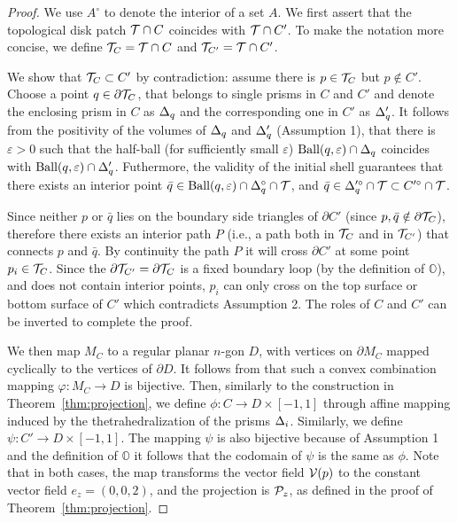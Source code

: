 \begin{proof}

    We use $A^\circ$ to denote the interior of a set $A$. 
    We first assert that the topological disk patch $\T \cap C$ coincides with $\T \cap C'$.
    To make the notation more concise, we define $\T_C = \T \cap C$ and $\T_{C'} = \T \cap C'$.
    
    We show that $\T_C \subset C'$ by contradiction: assume there is $p\in \T_C$ but $p \not\in C'$.
    Choose a point $q \in \partial \T_C$,  that belongs to single prisms in $C$ and $C'$ and denote the enclosing prism in $C$ as $\Prism_q$ and the corresponding one in $C'$ as $\Prism_{q}'$.
    It follows from the positivity of the volumes of $\Prism_q$ and $\Prism_q'$ (Assumption 1), that there is  $\varepsilon>0$ such that the half-ball (for sufficiently small $\varepsilon$)  $\text{Ball}(q, \varepsilon) \cap \Prism_q$  coincides with $ \text{Ball}(q, \varepsilon) \cap \Prism_q'$.
    Futhermore, the validity of the initial shell guarantees that there exists an interior point $\bar{q} \in \text{Ball}(q, \varepsilon) \cap \Prism_q^\circ \cap \T$, and $\bar{q}\in \Prism_q'^\circ \cap \T \subset C'^\circ\cap \T$.
    
     Since neither $p$ or $\bar{q}$ lies on the boundary side triangles of $\partial C'$ (since $p,\bar{q}\notin\partial \T_C$), therefore there exists an interior path $P$ (i.e., a path both in $\T_C$ and in $\T_{C'}$) that connects $p$ and $\bar{q}$. By continuity the path $P$ it will cross $\partial C'$ at some point $p_i\in \T_C$. 
    Since the $\partial \T_{C'} = \partial \T_C$ is a fixed boundary loop (by the definition of $\mathbb{O}$), and does not contain interior points, $p_i$ can only cross on the top surface or bottom surface of $C'$ which contradicts Assumption 2. The roles of $C$ and $C'$ can be inverted to complete the proof. 
    
    We then  map $M_C$ to a
    regular planar $n$-gon $D$, with vertices on $\partial M_C$ mapped cyclically to the vertices of $\partial D$.
    It follows from \cite[Corollary 6.2]{floater2003one} that such a convex combination mapping $\varphi\colon M_C \to D$ is bijective. Then, similarly to the construction in Theorem~\ref{thm:projection},
    we 
    define $\phi\colon C \to D\times[-1,1]$ through affine mapping induced by the thetrahedralization of the prisms $\Prism_i$.
    Similarly, we define $\psi \colon C' \to D\times[-1,1]$. The mapping $\psi$ is also bijective because of Assumption 1 and the definition of $\mathbb{O}$ it follows that the codomain of $\psi$ is the same as $\phi$.
    Note that in both cases, the map transforms the vector field $\V(p)$ to the constant vector field $e_z = (0,0,2)$, and the projection is $\P_z$, as defined in the proof of Theorem~\ref{thm:projection}. 
    

\end{proof}
